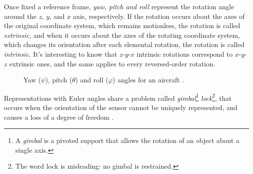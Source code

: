 Once fixed a reference frame, \textit{yaw, pitch and roll} represent the rotation angle around the $z$, $y$, and $x$ axis, respectively.
If the rotation occurs about the axes of the original coordinate system, which remains motionless, the rotation is called \textit{extrinsic}, and when it occurs about the axes of the rotating coordinate system, which changes its orientation after each elemental rotation, the rotation is called \textit{intrinsic}. It's interesting to know that $z$-$y$-$x$ intrinsic rotations correspond to $x$-$y$-$z$ extrinsic ones, and the same applies to every reversed-order rotation.

\begin{center}
	\begin{figure}[ht]
		\caption{Yaw ($\psi$), pitch ($\theta$) and roll ($\varphi$) angles for an aircraft \cite{WikimediaPlane}.}
	\end{figure}
\end{center}
Representations with Euler angles share a problem called \textit{gimbal}\footnote{A \textit{gimbal} is a pivoted support that allows the rotation of an object about a single axis.} \textit{lock}\footnote{The word lock is misleading: no gimbal is restrained.}, that occurs when the orientation of the sensor cannot be uniquely represented, and causes a loss of a degree of freedom \cite{Dil18}.

